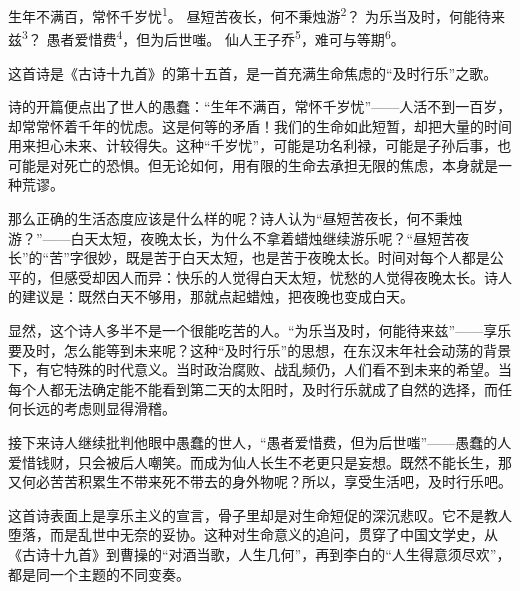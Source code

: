 
\begin{poem}
生年不满百，常怀千岁忧\textsuperscript{1}。
昼短苦夜长，何不秉烛游\textsuperscript{2}？
为乐当及时，何能待来兹\textsuperscript{3}？
愚者爱惜费\textsuperscript{4}，但为后世嗤。
仙人王子乔\textsuperscript{5}，难可与等期\textsuperscript{6}。
\end{poem}

\begin{annotations}
\end{annotations}

\begin{appreciation}
这首诗是《古诗十九首》的第十五首，是一首充满生命焦虑的“及时行乐”之歌。

诗的开篇便点出了世人的愚蠢：“生年不满百，常怀千岁忧”——人活不到一百岁，却常常怀着千年的忧虑。这是何等的矛盾！我们的生命如此短暂，却把大量的时间用来担心未来、计较得失。这种“千岁忧”，可能是功名利禄，可能是子孙后事，也可能是对死亡的恐惧。但无论如何，用有限的生命去承担无限的焦虑，本身就是一种荒谬。

那么正确的生活态度应该是什么样的呢？诗人认为“昼短苦夜长，何不秉烛游？”——白天太短，夜晚太长，为什么不拿着蜡烛继续游乐呢？“昼短苦夜长”的“苦”字很妙，既是苦于白天太短，也是苦于夜晚太长。时间对每个人都是公平的，但感受却因人而异：快乐的人觉得白天太短，忧愁的人觉得夜晚太长。诗人的建议是：既然白天不够用，那就点起蜡烛，把夜晚也变成白天。

显然，这个诗人多半不是一个很能吃苦的人。“为乐当及时，何能待来兹”——享乐要及时，怎么能等到未来呢？这种“及时行乐”的思想，在东汉末年社会动荡的背景下，有它特殊的时代意义。当时政治腐败、战乱频仍，人们看不到未来的希望。当每个人都无法确定能不能看到第二天的太阳时，及时行乐就成了自然的选择，而任何长远的考虑则显得滑稽。

接下来诗人继续批判他眼中愚蠢的世人，“愚者爱惜费，但为后世嗤”——愚蠢的人爱惜钱财，只会被后人嘲笑。而成为仙人长生不老更只是妄想。既然不能长生，那又何必苦苦积累生不带来死不带去的身外物呢？所以，享受生活吧，及时行乐吧。

这首诗表面上是享乐主义的宣言，骨子里却是对生命短促的深沉悲叹。它不是教人堕落，而是乱世中无奈的妥协。这种对生命意义的追问，贯穿了中国文学史，从《古诗十九首》到曹操的“对酒当歌，人生几何”，再到李白的“人生得意须尽欢”，都是同一个主题的不同变奏。
\end{appreciation}

